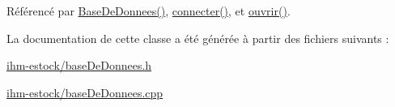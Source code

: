 Référencé par \hyperlink{class_base_de_donnees_a10dd177f1008f675ab78c2221b2a6750}{Base\+De\+Donnees()}, \hyperlink{class_base_de_donnees_ac20da193923a9bfea5e38ee5a54820cd}{connecter()}, et \hyperlink{class_base_de_donnees_a7f6a5510b08017b0d99115a84252f186}{ouvrir()}.



La documentation de cette classe a été générée à partir des fichiers suivants \+:\begin{DoxyCompactItemize}
\item 
\hyperlink{ihm-estock_2base_de_donnees_8h}{ihm-\/estock/base\+De\+Donnees.\+h}\item 
\hyperlink{ihm-estock_2base_de_donnees_8cpp}{ihm-\/estock/base\+De\+Donnees.\+cpp}\end{DoxyCompactItemize}
